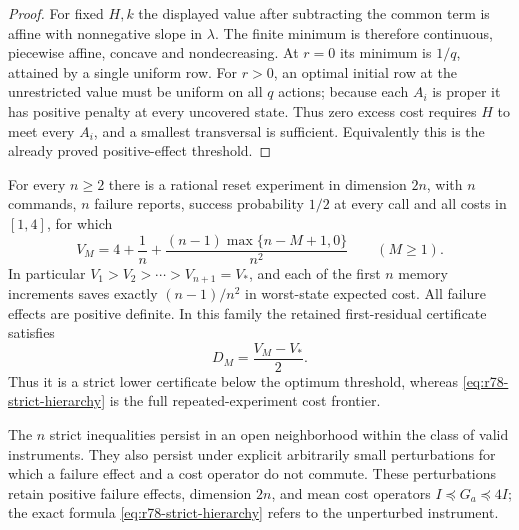 \begin{proof}
For fixed $H,k$ the displayed value after subtracting the common
term is affine with nonnegative slope in $\lambda$.  The finite
minimum is therefore continuous, piecewise affine, concave and
nondecreasing.  At $r=0$ its minimum is $1/q$, attained by a
single uniform row.  For $r>0$, an optimal initial row at the
unrestricted value must be uniform on all $q$ actions; because
each $A_i$ is proper it has positive penalty at every uncovered
state.  Thus zero excess cost requires $H$ to meet every $A_i$,
and a smallest transversal is sufficient.  Equivalently this is
the already proved positive-effect threshold.
\end{proof}

\begin{corollary}
\label{cor:r78-strict-hierarchy}
For every $n\ge2$ there is a rational reset experiment in dimension
$2n$, with $n$ commands, $n$ failure reports, success probability
$1/2$ at every call and all costs in $[1,4]$, for which
\begin{equation}\label{eq:r78-strict-hierarchy}
 V_M=4+\frac1n+
       \frac{(n-1)\max\{n-M+1,0\}}{n^2}
       \qquad(M\ge1).
\end{equation}
In particular $V_1>V_2>\cdots>V_{n+1}=V_*$, and each of the
first $n$ memory increments saves exactly $(n-1)/n^2$ in worst-state
expected cost.  All failure effects are positive definite.  In this
family the retained first-residual certificate satisfies
\begin{equation}\label{eq:r78-certificate-gap}
 D_M=\frac{V_M-V_*}{2}.
\end{equation}
Thus it is a strict lower certificate below the optimum threshold,
whereas \eqref{eq:r78-strict-hierarchy} is the full repeated-experiment
cost frontier.

The $n$ strict inequalities persist in an open neighborhood within
the class of valid instruments.  They also persist under explicit
arbitrarily small perturbations for which a failure effect and a
cost operator do not commute.  These perturbations retain positive
failure effects, dimension $2n$, and mean cost operators
$I\preccurlyeq G_a\preccurlyeq4I$; the exact
formula \eqref{eq:r78-strict-hierarchy} refers to the unperturbed
instrument.
\end{corollary}
